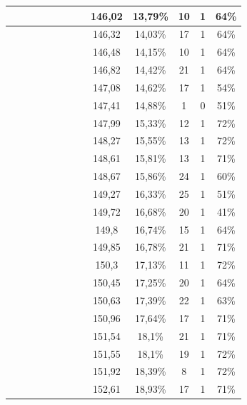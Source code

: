 \begin{center}
\begin{longtable}{|c|c|c|c|c|c|c|c|c|c|c|c|c|}
 \x &  &  \x &  &  &  &  \x &  \x & 146,02 & 13,79\% & 10 & 1 & 64\% \\ \hline
 \x &  \x &  \x &  \x &  &  &  \x &  \x & 146,32 & 14,03\% & 17 & 1 & 64\% \\ \hline
 \x &  &  \x &  \x &  &  &  &  \x & 146,48 & 14,15\% & 10 & 1 & 64\% \\ \hline
 \x &  &  \x &  &  \x &  &  &  & 146,82 & 14,42\% & 21 & 1 & 64\% \\ \hline
 \x &  \x &  &  &  &  &  \x &  \x & 147,08 & 14,62\% & 17 & 1 & 54\% \\ \hline
 \x &  &  &  \x &  &  &  &  & 147,41 & 14,88\% & 1 & 0 & 51\% \\ \hline
 \x &  \x &  &  \x &  \x &  \x &  \x &  \x & 147,99 & 15,33\% & 12 & 1 & 72\% \\ \hline
 \x &  \x &  \x &  \x &  &  \x &  \x &  & 148,27 & 15,55\% & 13 & 1 & 72\% \\ \hline
 \x &  &  \x &  \x &  \x &  \x &  &  & 148,61 & 15,81\% & 13 & 1 & 71\% \\ \hline
 \x &  &  &  \x &  \x &  &  &  \x & 148,67 & 15,86\% & 24 & 1 & 60\% \\ \hline
 \x &  &  &  \x &  &  &  &  \x & 149,27 & 16,33\% & 25 & 1 & 51\% \\ \hline
 \x &  &  &  &  &  &  &  & 149,72 & 16,68\% & 20 & 1 & 41\% \\ \hline
 \x &  &  \x &  &  &  &  \x &  & 149,8 & 16,74\% & 15 & 1 & 64\% \\ \hline
 \x &  \x &  \x &  \x &  &  \x &  &  & 149,85 & 16,78\% & 21 & 1 & 71\% \\ \hline
 \x &  &  &  &  &  \x &  \x &  \x & 150,3 & 17,13\% & 11 & 1 & 72\% \\ \hline
 \x &  \x &  \x &  \x &  &  &  \x &  & 150,45 & 17,25\% & 20 & 1 & 64\% \\ \hline
 \x &  &  \x &  \x &  \x &  &  &  & 150,63 & 17,39\% & 22 & 1 & 63\% \\ \hline
 \x &  &  \x &  \x &  &  \x &  &  & 150,96 & 17,64\% & 17 & 1 & 71\% \\ \hline
 \x &  &  \x &  &  \x &  \x &  &  & 151,54 & 18,1\% & 21 & 1 & 71\% \\ \hline
 \x &  &  &  &  \x &  \x &  &  \x & 151,55 & 18,1\% & 19 & 1 & 72\% \\ \hline
 \x &  &  \x &  &  &  \x &  \x &  \x & 151,92 & 18,39\% & 8 & 1 & 72\% \\ \hline
 \x &  \x &  &  &  \x &  \x &  \x &  & 152,61 & 18,93\% & 17 & 1 & 71\% \\ \hline

\end{longtable}
\end{center}
